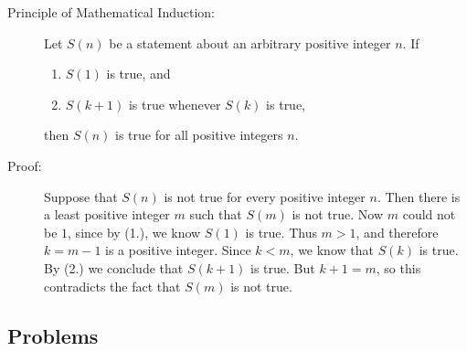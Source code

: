 \documentclass{article}
\newcommand{\0}{\mathbf 0}
\newcommand{\1}{\mathbf 1}
\begin{document}
\begin{description}
  \item[Principle of Mathematical Induction:] Let $S(n)$ be a statement about an arbitrary positive integer $n$. If
    \begin{enumerate}[\hspace{1cm}(1.)]
      \item $S(1)$ is true, and
      \item $S(k+1)$ is true whenever $S(k)$ is true,
    \end{enumerate}
    then $S(n)$ is true for all positive integers $n$.

  \item[Proof:] Suppose that $S(n)$ is not true for every positive integer $n$. Then there is a least positive integer $m$ such that $S(m)$ is not true. Now $m$ could not be $1$, since by (1.), we know $S(1)$ is true. Thus $m > 1$, and therefore $k = m-1$ is a positive integer. Since $k < m$, we know that $S(k)$ is true. By (2.) we conclude that $S(k+1)$ is true. But $k+1=m$, so this contradicts the fact that $S(m)$ is not true.
\end{description}


\subsection*{Problems}
\end{document}
